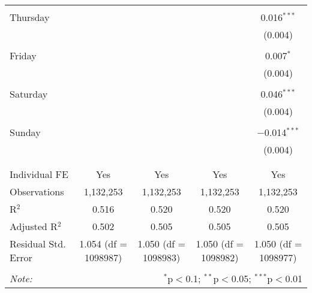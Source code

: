 \documentclass[
]{article}
\begin{document}
\begin{table}[!htbp]
{\begin{tabular}{@{\extracolsep{5pt}}lcccc}
  & & & & \\ 
 Thursday &  &  &  & 0.016$^{***}$ \\ 
  &  &  &  & (0.004) \\ 
  & & & & \\ 
 Friday &  &  &  & 0.007$^{*}$ \\ 
  &  &  &  & (0.004) \\ 
  & & & & \\ 
 Saturday &  &  &  & 0.046$^{***}$ \\ 
  &  &  &  & (0.004) \\ 
  & & & & \\ 
 Sunday &  &  &  & $-$0.014$^{***}$ \\ 
  &  &  &  & (0.004) \\ 
  & & & & \\ 
\hline \\[-1.8ex] 
Individual FE & Yes & Yes & Yes & Yes \\ 
Observations & 1,132,253 & 1,132,253 & 1,132,253 & 1,132,253 \\ 
R$^{2}$ & 0.516 & 0.520 & 0.520 & 0.520 \\ 
Adjusted R$^{2}$ & 0.502 & 0.505 & 0.505 & 0.505 \\ 
Residual Std. Error & 1.054 (df = 1098987) & 1.050 (df = 1098983) & 1.050 (df = 1098982) & 1.050 (df = 1098977) \\ 
\hline 
\hline \\[-1.8ex] 
\textit{Note:}  & \multicolumn{4}{r}{$^{*}$p$<$0.1; $^{**}$p$<$0.05; $^{***}$p$<$0.01} \\ 
\end{tabular}
} 
\end{table} 
\newpage
\end{document}
